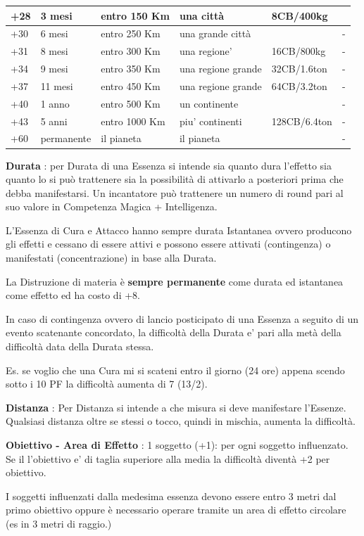\documentclass[a4paper,10 pt,twoside,openany]{book}
\begin{document}
\begin{tabularx}{0.95\textwidth}{lXXXXX}
	\hline
	+28&3 mesi&entro 150 Km&una città&8CB/400kg&\\
	\hline
	+30&6 mesi&entro 250 Km&una grande città&&-\\
	\hline
	+31&8 mesi&entro 300 Km&una regione'&16CB/800kg&-\\
	\hline
	+34&9 mesi&entro 350 Km&una regione grande&32CB/1.6ton&-\\
	\hline
	+37&11 mesi&entro 450 Km&una regione grande&64CB/3.2ton&-\\
	\hline
	+40&1 anno&entro 500 Km&un continente&&-\\
	\hline
	+43&5 anni&entro 1000 Km&piu' continenti&128CB/6.4ton&-\\
	\hline
	+60&permanente&il pianeta&il pianeta&&-\\
	\hline
\end{tabularx}
\bigskip

\textbf{Durata} : per Durata di una Essenza si intende sia quanto dura l'effetto sia quanto lo si può trattenere sia la possibilità di attivarlo a posteriori prima che debba manifestarsi. Un incantatore può trattenere un numero di round pari al suo valore in Competenza Magica + Intelligenza.

L'Essenza di Cura e Attacco hanno sempre durata Istantanea ovvero producono gli effetti e cessano di essere attivi e possono essere attivati (contingenza) o manifestati (concentrazione) in base alla Durata.

La Distruzione di materia è \textbf{sempre permanente} come durata ed istantanea come effetto ed ha costo di +8.

In caso di contingenza ovvero di lancio posticipato di una Essenza a seguito di un evento scatenante concordato, la difficoltà della Durata e' pari alla metà della difficoltà data della Durata stessa.

Es. se voglio che una Cura mi si scateni entro il giorno (24 ore) appena scendo sotto i 10 PF la difficoltà aumenta di 7 (13/2).


\textbf{Distanza} : Per Distanza si intende a che misura si deve manifestare l'Essenze.
Qualsiasi distanza oltre se stessi o tocco, quindi in mischia, aumenta la difficoltà.


\textbf{Obiettivo - Area di Effetto} : 1 soggetto (+1): per ogni soggetto influenzato. Se il l'obiettivo e' di taglia superiore alla media la difficoltà diventà +2 per obiettivo.

I soggetti influenzati dalla medesima essenza devono essere entro 3 metri dal primo obiettivo oppure è necessario operare tramite un area di effetto circolare (es in 3 metri di raggio.)
\end{document}
